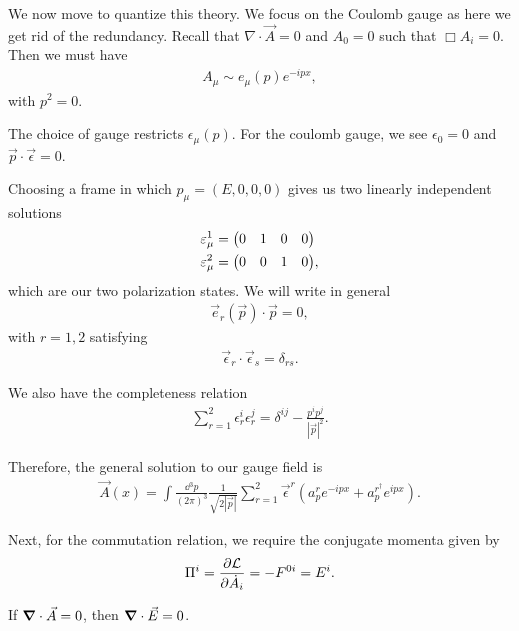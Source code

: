 
We now move to quantize this theory. We focus on the Coulomb gauge as here we get rid of the redundancy. Recall that $\nabla \cdot \vec{A} = 0 $ and $A_0 = 0$ such that $\Box A_i = 0$. Then we must have
\begin{align}
    A_\mu \sim  e_\mu \left( p \right) e^{-ipx}
,\end{align}
with $p^2 = 0$.

The choice of gauge restricts $\epsilon_\mu \left( p \right) $. For the coulomb gauge, we see $\epsilon_0 = 0$ and $\vec{p} \cdot \vec{\epsilon} = 0$. 

Choosing a frame in which $p_\mu = \left( E, 0, 0, 0 \right) $ gives us two linearly independent solutions
\begin{align}
    \epsilon_{\mu}^{1} &= \mqty( 0 & 1 & 0 & 0 ) \\
    \epsilon_{\mu}^{2} &= \mqty( 0 & 0 & 1 & 0 ) 
,\end{align}
which are our two polarization states. We will write in general 
\begin{align}
    \vec{e}_r \left( \vec{p} \right) \cdot \vec{p} = 0
,\end{align}
with $r = 1,2$ satisfying
\begin{align}
    \vec{\epsilon}_{r} \cdot \vec{\epsilon}_{s} = \delta_{rs}
.\end{align}

We also have the completeness relation
\begin{align}
    \sum_{r=1}^{2}  \epsilon_{r}^{i} \epsilon_{r}^{j} = \delta^{ij}  - \frac{p^{i} p^{j}}{\left| \vec{p} \right|^2}
.\end{align} 

Therefore, the general solution to our gauge field is
\begin{align}
    \vec{A}\left( x \right) = \int \frac{\dd{^3p}}{\left( 2\pi\right)^3} \frac{1}{\sqrt{2 \left| \vec{p} \right| } } \sum_{r=1}^{2}  \vec{\epsilon}^{r} \left( a^{r}_p e^{-i p x} + a^{r^{\dag}}_p e^{ipx} \right) 
.\end{align}

Next, for the commutation relation, we require the conjugate momenta given by
\begin{align}
    \Pi^{i} = \pdv{\mathcal{L}}{\dot{A}_{i}} = -F^{0i} = E^{i}
.\end{align}

If $\grad \cdot \vec{A} = 0$, then $\grad \cdot \vec{E} = 0$.

